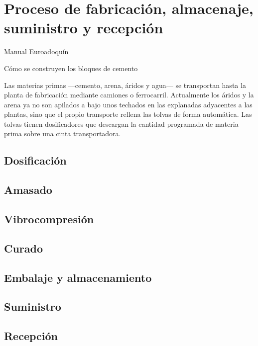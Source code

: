 \chapter{Proceso de fabricación, almacenaje, suministro y recepción}
Manual Euroadoquín

Cómo se construyen los bloques de cemento

Las materias primas —cemento, arena, áridos y agua— se transportan hasta la planta de fabricación mediante camiones o ferrocarril. Actualmente los áridos y la arena ya no son apilados a bajo unos techados en las explanadas adyacentes a las plantas, sino que el propio transporte rellena las tolvas de forma automática. Las tolvas tienen dosificadores que descargan la cantidad programada de materia prima sobre una cinta transportadora.
\section{Dosificación}
\section{Amasado}
\section{Vibrocompresión}
\section{Curado}
\section{Embalaje y almacenamiento}
\section{Suministro}
\section{Recepción}
